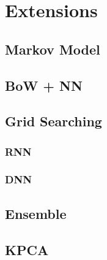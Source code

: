 \section{Extensions}
\label{sec:extensions}

  \subsection{Markov Model}
  \label{sec:markov_model}

  \subsection{BoW + NN}
  \label{sec:bow_nn}

  \subsection{Grid Searching}
  \label{sec:grid_search}

    \subsubsection{RNN}
    \label{sec:rnn_grid_search}

    \subsubsection{DNN}
    \label{sec:dnn_grid_search}

    \subsection{Ensemble}
    \label{sec:ensemble}

    \subsection{KPCA}
    \label{sec:kpca}
  
